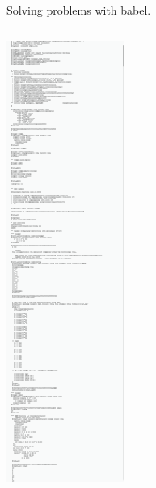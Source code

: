 \documentclass[presentation, CJK, compress,aspectratio=169]{beamer}
\begin{document}
\begin{frame}[label={sec:org98b6881},fragile]{Solving problems with babel.}
\begin{columns}[t]
\begin{column}{0.20\columnwidth}
\begin{center}
\includegraphics[width=.9\linewidth]{buffer_minimap_babel_slide.png}
\end{center}
\end{column}
\end{columns}


\end{frame}
\end{document}
